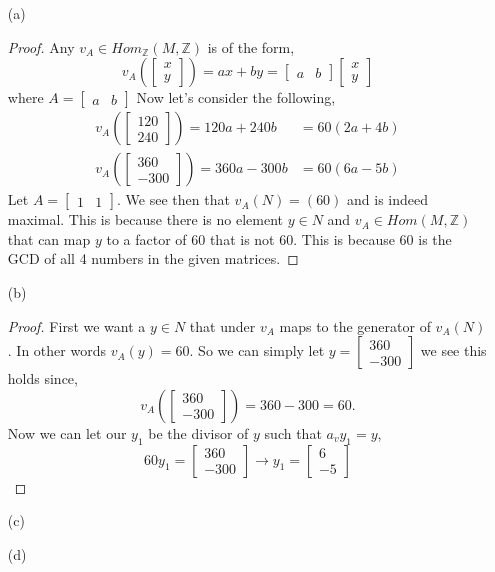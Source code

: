 \documentclass[11pt]{article}
\newcommand{\zz}{\mathbb Z}   %
\begin{document}
\begin{itemize}
  \item[(a)]
  \begin{proof}
    Any $v_A\in Hom_\zz(M,\zz)$ is of the form,
    \[v_A\left(\begin{bmatrix}
      x \\ y
    \end{bmatrix}\right) = ax + by = \begin{bmatrix}
      a & b
    \end{bmatrix} \begin{bmatrix}
      x \\ y
    \end{bmatrix}\]
    where $A = \begin{bmatrix}
      a & b
    \end{bmatrix}$
    Now let's consider the following,
    \begin{align*}
      v_A\left(\begin{bmatrix}
        120 \\ 240
      \end{bmatrix}\right) = 120a + 240b &= 60(2a + 4b) \\
      v_A\left(\begin{bmatrix}
        360 \\ -300
      \end{bmatrix}\right) = 360a -300b &= 60(6a-5b)
    \end{align*}
    Let $A = \begin{bmatrix}
      1 & 1
    \end{bmatrix}$. We see then that $v_A(N) = (60)$ and is indeed maximal. This is because there is no element $y\in N$ and $v_A\in Hom(M,\zz)$ that can map $y$ to a factor of 60 that is not 60. This is because 60 is the GCD of all 4 numbers in the given matrices. 
  \end{proof} 
  \item[(b)]
  \begin{proof}
    First we want a $y \in N$ that under $v_A$ maps to the generator of $v_A(N)$. In other words $v_A(y) = 60$. So we can simply let $y = \begin{bmatrix}
      360 \\ -300
    \end{bmatrix}$ we see this holds since,
    \[v_A\left(\begin{bmatrix}
      360 \\ -300
    \end{bmatrix}\right) = 360 - 300 = 60.\] Now we can let our $y_1$ be the divisor of $y$ such that $a_vy_1 = y$,
    \[60y_1 = \begin{bmatrix}
      360 \\ -300
    \end{bmatrix} \rightarrow y_1 = \begin{bmatrix}
      6 \\ -5
    \end{bmatrix} \]    
  \end{proof} 
  \item[(c)]
  \item[(d)]   
\end{itemize}
\end{document}
